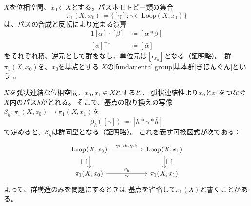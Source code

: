 \documentclass[report]{jlreq}
\begin{document}
\begin{definition}[基本群]
    $X$を位相空間、$x_0 \in X$とする。パスホモトピー類の集合
    \begin{equation}
        \pi_1(X, x_0)
            \coloneqq \{ [\gamma] \colon \gamma \in \mathrm{Loop}(X, x_0) \}
    \end{equation}
    は、パスの合成と反転により定まる演算
    \begin{alignat}{1}
        [\alpha] \cdot [\beta] &\coloneqq [\alpha * \beta] \\
        [\alpha]^{-1} &\coloneqq [\bar{\alpha}]
    \end{alignat}
    をそれぞれ積、逆元として群をなし、単位元は$[c_{x_0}]$となる（証明略）。
    群$\pi_1(X, x_0)$を、$x_0$を基点とする
    $X$の[fundamental group]{基本群}[きほんぐん]という
    \footnotemark{}。
\end{definition}


\begin{remark}[弧状連結空間の基本群]
    $X$を弧状連結な位相空間、$x_0, x_1 \in X$とすると、
    弧状連結性より$x_0$と$x_1$をつなぐ$X$内のパス$h$がとれる。
    そこで、基点の取り換えの写像$\beta_h \colon \pi_1(X, x_0) \to \pi_1(X, x_1)$を
    \begin{equation}
        \beta_h([\gamma]) \coloneqq [h * \gamma * \bar{h}]
    \end{equation}
    で定めると、$\beta_h$は群同型となる（証明略）。
    これを表す可換図式が次である：
    \begin{equation}
        \begin{tikzcd}[row sep=normal, column sep=huge]
            \mathrm{Loop}(X, x_0)
                \ar{d}[swap]{[\,\cdot\,]}
                \ar{r}{\gamma \mapsto h \cdot \gamma \cdot \bar{h}}
                & \mathrm{Loop}(X, x_1) \ar{d}{[\,\cdot\,]} \\
            \pi_1(X, x_0) \ar{r}{\beta_h}[swap]{\cong} & \pi_1(X, x_1)
        \end{tikzcd}
    \end{equation}
    よって、群構造のみを問題にするときは
    基点を省略して$\pi_1(X)$と書くことがある。
\end{remark}
\end{document}
